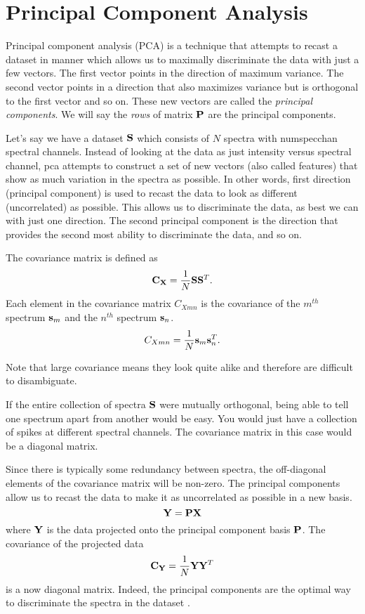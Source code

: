 \section{Principal Component Analysis}

Principal component analysis (PCA) is a technique that attempts to recast a dataset in manner which allows us to maximally discriminate the data with just a few vectors. The first vector points in the direction of maximum variance. The second vector points in a direction that also maximizes variance but is orthogonal to the first vector and so on. These new vectors are called the \emph{principal components}. We will say the \emph{rows} of matrix $\mathbf{P}$ are the principal components. 

Let's say we have a dataset $\mathbf{S}$ which consists of $N$ spectra with \gls{numspecchan} spectral channels. Instead of looking at the data as just intensity versus spectral channel, \gls{pca} attempts to construct a set of new vectors (also called features) that show as much variation in the spectra as possible. In other words, first direction (principal component) is used to recast the data to look as different (uncorrelated) as possible. This allows us to discriminate the data, as best we can with just one direction. The second principal component is the direction that provides the second most ability to discriminate the data, and so on. 

The covariance matrix is defined as
\begin{equation}
\mathbf{C_{X}} = \frac{1}{N} \mathbf{S} \mathbf{S}^{T}.
\end{equation}
Each element in the covariance matrix $C_{Xmn}$ is the covariance of the $m^{th}$ spectrum $\mathbf{s}_m$ and the $n^{th}$ spectrum $\mathbf{s}_n$. 
\begin{equation}
C_{Xmn} = \frac{1}{N} \mathbf{s}_m \mathbf{s}_n^{T}.
\end{equation}

Note that large covariance means they look quite alike and therefore are difficult to disambiguate.

If the entire collection of spectra $\mathbf{S}$ were mutually orthogonal, being able to tell one spectrum apart from another would be easy. You would just have a collection of spikes at different spectral channels. The covariance matrix in this case would be a diagonal matrix. 

Since there is typically some redundancy between spectra, the off-diagonal elements of the covariance matrix will be non-zero. The principal components allow us to recast the data to make it as uncorrelated as possible in a new basis. 
\begin{equation}
	\mathbf{Y} = \mathbf{PX}
\end{equation}
where $\mathbf{Y}$ is the data projected onto the principal component basis $\mathbf{P}$. The covariance of the projected data
\begin{equation}
	\mathbf{C_{Y}} = \frac{1}{N} \mathbf{Y} \mathbf{Y}^{T} 
\end{equation}
is a now diagonal matrix. Indeed, the principal components are the optimal way to discriminate the spectra in the dataset \cite{}.

